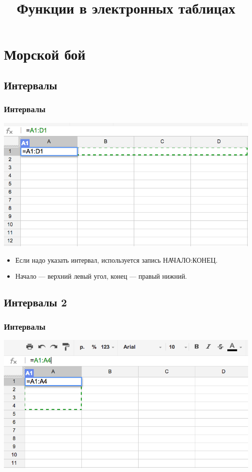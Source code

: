 \documentclass[compress,red]{beamer}
\title{Функции в электронных таблицах}
\begin{document}
\maketitle

\section{Морской бой}

\subsection{Интервалы}
\begin{frame}[fragile]
  \frametitle{Интервалы}
  \centerline{\includegraphics[width=1.0\textwidth]{images/03.png}}
  \begin{itemize}
      \item Если надо указать интервал, используется запись НАЧАЛО:КОНЕЦ.
      \item Начало --- верхний левый угол, конец --- правый нижний.
  \end{itemize}
\end{frame}

\subsection{Интервалы 2}
\begin{frame}[fragile]
  \frametitle{Интервалы}
  \centerline{\includegraphics[width=1.0\textwidth]{images/02.png}}
\end{frame}
\end{document}
